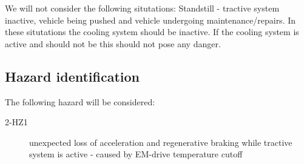 We will not consider the following situtations: Standstill - tractive system inactive,
vehicle being pushed and vehicle undergoing maintenance/repairs.
In these situtations the cooling system should be inactive.
If the cooling system is active and should not be this should not pose any danger.

\subsection{Hazard identification}
%

%
%

The following hazard will be considered:
\begin{description}
\item [2-HZ1] unexpected loss of acceleration and regenerative braking while tractive system is active - caused by EM-drive temperature cutoff
\end{description}

